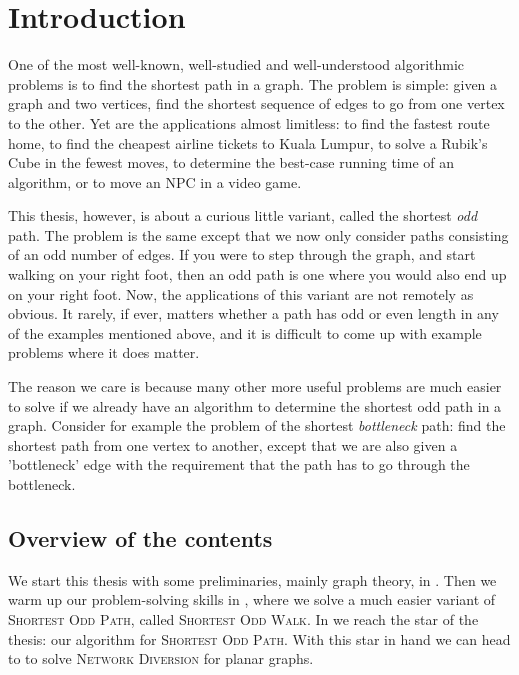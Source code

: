 \chapter{Introduction}

One of the most well-known, well-studied and well-understood algorithmic problems is to find the shortest path in a graph. The problem is simple: given a graph and two vertices, find the shortest sequence of edges to go from one vertex to the other. Yet are the applications almost limitless: to find the fastest route home, to find the cheapest airline tickets to Kuala Lumpur, to solve a Rubik's Cube in the fewest moves, to determine the best-case running time of an algorithm, or to move an NPC in a video game.

This thesis, however, is about a curious little variant, called the shortest \emph{odd} path. The problem is the same except that we now only consider paths consisting of an odd number of edges. If you were to step through the graph, and start walking on your right foot, then an odd path is one where you would also end up on your right foot. Now, the applications of this variant are not remotely as obvious. It rarely, if ever, matters whether a path has odd or even length in any of the examples mentioned above, and it is difficult to come up with example problems where it does matter.

The reason we care is because many other more useful problems are much easier to solve if we already have an algorithm to determine the shortest odd path in a graph. Consider for example the problem of the shortest \emph{bottleneck} path: find the shortest path from one vertex to another, except that we are also given a 'bottleneck' edge with the requirement that the path has to go through the bottleneck. 



\section*{Overview of the contents}
We start this thesis with some preliminaries, mainly graph theory, in . Then we warm up our problem-solving skills in , where we solve a much easier variant of \textsc{Shortest Odd Path}, called \textsc{Shortest Odd Walk}. In  we reach the star of the thesis: our algorithm for \textsc{Shortest Odd Path}. With this star in hand we can head to  to solve \textsc{Network Diversion} for planar graphs. 

